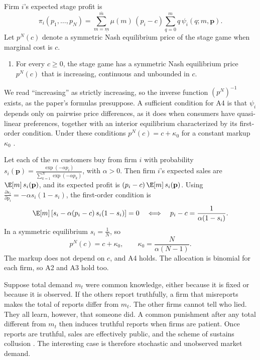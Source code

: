 Firm $i$'s expected stage profit is
\begin{equation}\label{eq:12-hs-static}
  \pi_i(p_1, \dots, p_N) = \sum_{m=\underline m}^{\bar m}\mu(m)\,(p_i - c)\sum_{q=0}^{m} q\,\psi_i(q; m, \mathbf{p}) .
\end{equation}
Let $p^N(c)$ denote a symmetric Nash equilibrium price of the stage game when marginal cost is $c$.
\begin{enumerate}[label=A\arabic*.,leftmargin=*,start=4]
\item For every $c \ge 0$, the stage game has a symmetric Nash equilibrium price $p^N(c)$ that is increasing,
continuous and unbounded in $c$.
\end{enumerate}
We read ``increasing'' as strictly increasing, so the inverse function $(p^N)^{-1}$ exists, as the paper's
formulas presuppose. A sufficient condition for A4 is that $\psi_i$ depends only on pairwise price differences,
as it does when consumers have quasi-linear preferences, together with an interior equilibrium characterized by
its first-order condition. Under these conditions $p^N(c) = c + \kappa_0$ for a constant markup $\kappa_0$
\citep[p.~2431]{HarringtonSkrzypacz2011}.

\begin{example}\label{ex:12-hs-logit}
Let each of the $m$ customers buy from firm $i$ with probability
$s_i(\mathbf{p}) = \frac{\exp(-\alpha p_i)}{\sum_{k=1}^{N}\exp(-\alpha p_k)}$, with $\alpha > 0$. Then firm $i$'s
expected sales are $\E[m]\,s_i(\mathbf{p})$, and its expected profit is $(p_i - c)\,\E[m]\,s_i(\mathbf{p})$. Using
$\frac{\partial s_i}{\partial p_i} = -\alpha s_i(1 - s_i)$, the first-order condition is
\begin{equation*}
  \E[m]\left[s_i - \alpha(p_i - c)\,s_i(1 - s_i)\right] = 0
  \quad\Longleftrightarrow\quad
  p_i - c = \frac{1}{\alpha(1 - s_i)} .
\end{equation*}
In a symmetric equilibrium $s_i = \frac{1}{N}$, so
\begin{equation*}
  p^N(c) = c + \kappa_0, \qquad \kappa_0 = \frac{N}{\alpha(N-1)} .
\end{equation*}
The markup does not depend on $c$, and A4 holds. The allocation is binomial for each firm, so A2 and A3 hold too.
\end{example}

\begin{remark}\label{rem:12-hs-observable}
Suppose total demand $m_t$ were common knowledge, either because it is fixed or because it is observed. If the
others report truthfully, a firm that misreports makes the total of reports differ from $m_t$. The other firms cannot
tell who lied. They all learn, however, that someone did. A common punishment after any total different from $m_t$
then induces truthful reports when firms are patient. Once reports are truthful, sales are effectively public, and
the scheme of \citet{HarringtonSkrzypacz2007} sustains collusion \citep[p.~2432]{HarringtonSkrzypacz2011}. The
interesting case is therefore stochastic and unobserved market demand.
\end{remark}

